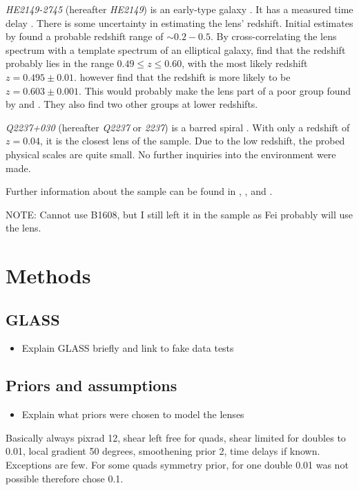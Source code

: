\documentclass[useAMS,usenatbib]{mn2e}
\begin{document}
\textit{HE2149-2745} (hereafter \textit{HE2149}) is an early-type galaxy \citep{2007A&A...465...51E}. It has a measured time delay \citep{2002A&A...383...71B}. There is some uncertainty in estimating the lens' redshift. Initial estimates by \cite{1996A&A...315L.405W,2000ApJ...543..131K} found a probable redshift range of $\sim0.2-0.5$. By cross-correlating the lens spectrum with a template spectrum of an elliptical galaxy, \cite{2002A&A...383...71B} find that the redshift probably lies in the range $0.49\leq z \leq 0.60$, with the most likely redshift $z=0.495\pm0.01$. \cite{2007A&A...465...51E} however find that the redshift is more likely to be $z=0.603\pm0.001$. This would probably make the lens part of a poor group found by \cite{2006ApJ...641..169M} and \cite{2006ApJ...646...85W}. They also find two other groups at lower redshifts.

\textit{Q2237+030} (hereafter \textit{Q2237} or \textit{2237}) is a barred spiral \citep{1988AJ.....95.1331Y}. With only a redshift of $z=0.04$, it is the closest lens of the sample. Due to the low redshift, the probed physical scales are quite small. No further inquiries into the environment were made.

Further information about the sample can be found in \cite{leier11phd}, \cite{2011ApJ...740...97L}, and \cite{2012A&A...538A..99S}.

NOTE: Cannot use B1608, but I still left it in the sample as Fei probably will use the lens.


\section{Methods}
\subsection{GLASS}
\begin{itemize}
\item Explain GLASS briefly and link to fake data tests
\end{itemize}

\subsection{Priors and assumptions}
\begin{itemize}
\item Explain what priors were chosen to model the lenses
\end{itemize}

Basically always pixrad 12, shear left free for quads, shear limited for doubles to 0.01, local gradient 50 degrees, smoothening prior 2, time delays if known. Exceptions are few. For some quads symmetry prior, for one double 0.01 was not possible therefore chose 0.1.
\end{document}

